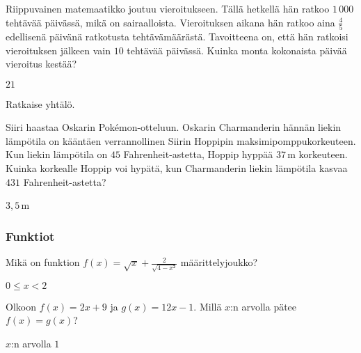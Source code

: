 \begin{tehtava}
	Riippuvainen matemaatikko joutuu vieroitukseen. Tällä hetkellä hän ratkoo $1\,000$ tehtävää päivässä, mikä on sairaalloista. Vieroituksen aikana hän ratkoo aina $\frac{4}{5}$ edellisenä päivänä ratkotusta tehtävämäärästä. Tavoitteena on, että hän ratkoisi vieroituksen jälkeen vain $10$ tehtävää päivässä. Kuinka monta kokonaista päivää vieroitus kestää?
\begin{vastaus}
	$21$
\end{vastaus}
\end{tehtava}

\begin{tehtava}
	Ratkaise yhtälö.
	
\begin{vastaus}
\end{vastaus}
\end{tehtava}

\begin{tehtava}
	Siiri haastaa Oskarin Pokémon-otteluun. Oskarin Charmanderin hännän liekin lämpötila on kääntäen verrannollinen Siirin Hoppipin maksimipomppukorkeuteen. Kun liekin lämpötila on $45$ Fahrenheit-astetta, Hoppip hyppää $37$\,m korkeuteen. Kuinka korkealle Hoppip voi hypätä, kun Charmanderin liekin lämpötila kasvaa $431$ Fahrenheit-astetta? %
	
	\begin{vastaus}
	$3,5$\,m
	\end{vastaus}
\end{tehtava}

\subsubsection*{Funktiot}

\begin{tehtava}
	Mikä on funktion $f(x)=\sqrt{x}+\frac{2}{\sqrt{4-x²}}$ määrittelyjoukko?
\begin{vastaus}
	{$0\leq x<2$}
		
\end{vastaus}
\end{tehtava}

\begin{tehtava}
	Olkoon $f(x)=2x+9$ ja $g(x)=12x-1$. Millä $x$:n arvolla pätee $f(x)=g(x)$? 

\begin{vastaus}
$x$:n arvolla $1$
		
\end{vastaus}
\end{tehtava}

